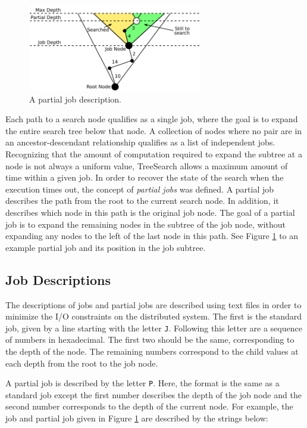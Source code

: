 \documentclass[11pt]{article}
\def\TreeSearch{{TreeSearch}}
\begin{document}
\begin{figure}\centering
	\includegraphics[width=3in]{figures/Jobs}
	\caption{\label{fig:jobs}A partial job description.}
\end{figure}


Each path to a search node qualifies as a single job, where the goal 
	is to expand the entire search tree below that node.
A collection of nodes where no pair are in an ancestor-descendant relationship 
	qualifies as a list of independent jobs.
Recognizing that the amount of computation required to expand 
	the subtree at a node is not always a uniform value,
	{\TreeSearch} allows a maximum amount of time 
	within a given job.
In order to recover the state of the search when the execution times out,
	the concept of \emph{partial jobs} was defined.
A partial job describes the path from the root to the current search node.
In addition, it describes which node in this path is the original job node.
The goal of a partial job is to expand the remaining nodes in the
	subtree of the job node, without expanding any nodes to 
	the left of the last  node in this path.
See Figure \ref{fig:jobs} to an example partial job and its position in the
	job subtree.

\subsection{Job Descriptions}


The descriptions of jobs and partial jobs are described using text files
	in order to minimize the I/O constraints on the distributed system.
The first is the standard job, given by a line starting with the letter \texttt{J}.
Following this letter are a sequence of numbers in hexadecimal.
The first two should be the same, corresponding to the depth of the node.
The remaining numbers correspond to the child values at each depth from the root to the job node.

A partial job is described by the letter \texttt{P}.
Here, the format is the same as a standard job except the first number describes the depth of the job node
	and the second number corresponds to 
	the depth of the current node.
For example, the job and partial job given in Figure \ref{fig:jobs} are described by the strings below:
\end{document}
